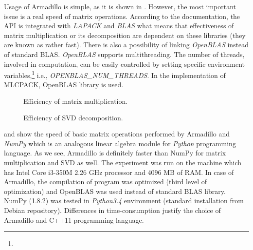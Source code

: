 Usage of Armadillo is simple, as it is shown in . However, the most important issue is a real speed of matrix operations. According to the documentation, the API is integrated with \textit{LAPACK} and \textit{BLAS} what means that effectiveness of matrix multiplication or its decomposition are dependent on these libraries (they are known as rather fast). There is also a possibility of linking \textit{OpenBLAS} instead of standard BLAS. \textit{OpenBLAS} supports multithreading. The number of threads, involved in computation, can be easily controlled by setting specific environment variables,\footnote{} i.e., \textit{OPENBLAS\_NUM\_THREADS}. In the implementation of MLCPACK, OpenBLAS library is used.    

\begin{figure}[h]
\centering
\caption{Efficiency of matrix multiplication.}
\label{fig:mulperf}
\end{figure}

\begin{figure}[h]
\centering
\caption{Efficiency of SVD decomposition.}
\label{fig:svdperf}
\end{figure}


 and  show the speed of basic matrix operations performed by Armadillo and \textit{NumPy} which is an analogous linear algebra module for \textit{Python} programming language. As we see, Armadillo is definitely faster than NumPy for matrix multiplication and SVD as well.   
The experiment was run on the machine which has Intel Core i3-350M 2.26 GHz processor and 4096 MB of RAM. In case of Armadillo, the compilation of program was optimized (third level of optimization) and OpenBLAS was used instead of standard BLAS library. NumPy (1.8.2) was tested in \textit{Python3.4} environment (standard installation from Debian repository). Differences in time-consumption justify the choice of Armadillo and C++11 programming language.

